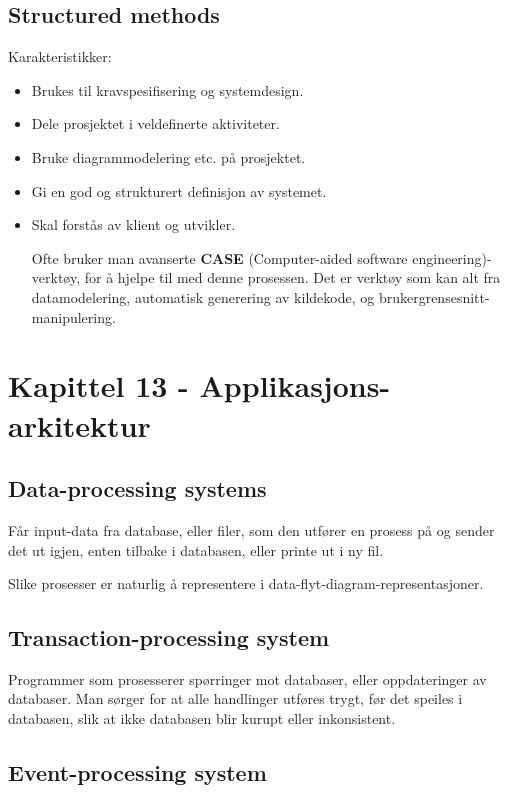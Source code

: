 \documentclass[11pt]{article}
\begin{document}
\subsection{Structured methods}
\label{sec-7.5}

   Karakteristikker:

\begin{itemize}
\item Brukes til kravspesifisering og systemdesign.
\item Dele prosjektet i veldefinerte aktiviteter.
\item Bruke diagrammodelering etc. på prosjektet.
\item Gi en god og strukturert definisjon av systemet.
\item Skal forstås av klient og utvikler.

    Ofte bruker man avanserte \textbf{CASE} (Computer-aided software engineering)-verktøy, 
    for å hjelpe til med denne prosessen. Det er verktøy som kan alt fra datamodelering, 
    automatisk generering av kildekode, og brukergrensesnitt-manipulering.
\end{itemize}
\section{Kapittel 13 - Applikasjons-arkitektur}
\label{sec-8}
\subsection{Data-processing systems}
\label{sec-8.1}

   Får input-data fra database, eller filer, som den utfører en prosess på og sender det 
   ut igjen, enten tilbake i databasen, eller printe ut i ny fil.

   Slike prosesser er naturlig å representere i data-flyt-diagram-representasjoner. 
\subsection{Transaction-processing system}
\label{sec-8.2}

   Programmer som prosesserer spørringer mot databaser, eller oppdateringer av databaser. 
   Man sørger for at alle handlinger utføres trygt, før det speiles i databasen, slik at ikke databasen blir kurupt eller inkonsistent.
\subsection{Event-processing system}
\label{sec-8.3}
\end{document}
